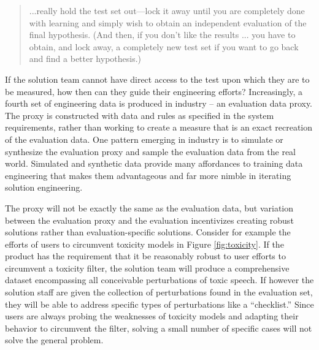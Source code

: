 \begin{quote}
    ...really hold the test set out—lock it away until you are completely done with learning and simply wish to obtain an independent evaluation of the final hypothesis. (And then, if you don’t like the results ... you have to obtain, and lock away, a completely new test set if you want to go back and find a better hypothesis.)
\end{quote}

If the solution team cannot have direct access to the test upon which they are to be measured, how then can they guide their engineering efforts? Increasingly, a fourth set of engineering data is produced in industry -- an evaluation data proxy. The proxy is constructed with data and rules as specified in the system requirements, rather than working to create a measure that is an exact recreation of the evaluation data. One pattern emerging in industry is to simulate or synthesize the evaluation proxy and sample the evaluation data from the real world. Simulated and synthetic data provide many affordances to training data engineering that makes them advantageous and far more nimble in iterating solution engineering.


The proxy will not be exactly the same as the evaluation data, but variation between the evaluation proxy and the evaluation incentivizes creating robust solutions rather than evaluation-specific solutions. Consider for example the efforts of users to circumvent toxicity models in Figure \ref{fig:toxicity}. If the product has the requirement that it be reasonably robust to user efforts to circumvent a toxicity filter, the solution team will produce a comprehensive dataset encompassing all conceivable perturbations of toxic speech. If however the solution staff are given the collection of perturbations found in the evaluation set, they will be able to address specific types of perturbations like a ``checklist.'' Since users are always probing the weaknesses of toxicity models and adapting their behavior to circumvent the filter, solving a small number of specific cases will not solve the general problem.

